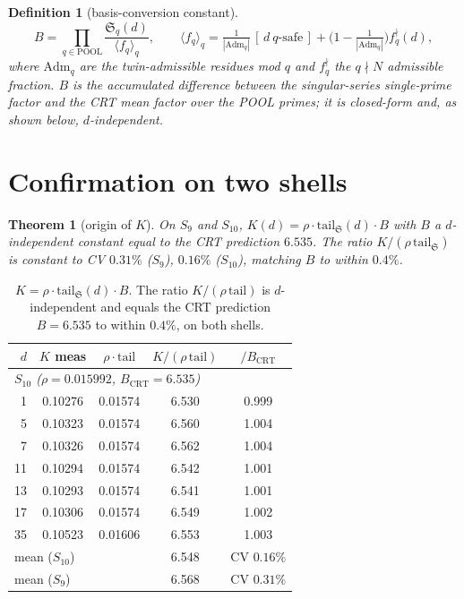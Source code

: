 \documentclass[11pt]{article}
\newcommand{\Adm}{\mathrm{Adm}}
\newtheorem{theorem}{Theorem}\newtheorem{definition}{Definition}
\begin{document}
\begin{definition}[basis-conversion constant]
\[
  B=\prod_{q\in\mathrm{POOL}}\frac{\mathfrak{S}_q(d)}{\langle f_q\rangle_q},\qquad
  \langle f_q\rangle_q=\tfrac{1}{|\!\Adm_q|}\,[\,d\ q\text{-safe}\,]
   +\bigl(1-\tfrac{1}{|\!\Adm_q|}\bigr)f_q^{\nmid}(d),
\]
where $\Adm_q$ are the twin-admissible residues mod $q$ and $f_q^{\nmid}$ the
$q\nmid N$ admissible fraction. $B$ is the accumulated difference between the
singular-series single-prime factor and the CRT mean factor over the POOL primes;
it is closed-form and, as shown below, $d$-independent.
\end{definition}

\section{Confirmation on two shells}

\begin{theorem}[origin of $K$]\label{thm:K}
On $S_9$ and $S_{10}$, $K(d)=\rho\cdot\mathrm{tail}_{\mathfrak S}(d)\cdot B$ with
$B$ a $d$-independent constant equal to the CRT prediction $6.535$. The ratio
$K/(\rho\,\mathrm{tail}_{\mathfrak S})$ is constant to CV $0.31\%$ ($S_9$),
$0.16\%$ ($S_{10}$), matching $B$ to within $0.4\%$.
\end{theorem}

\begin{table}[h]\centering\small
\begin{tabular}{rcccc}
\toprule
$d$ & $K$ meas & $\rho\cdot\mathrm{tail}$ & $K/(\rho\,\mathrm{tail})$ & $/B_{\mathrm{CRT}}$\\
\midrule
\multicolumn{5}{l}{\emph{$S_{10}$ ($\rho=0.015992$, $B_{\mathrm{CRT}}=6.535$)}}\\
1  & 0.10276 & 0.01574 & 6.530 & 0.999\\
5  & 0.10323 & 0.01574 & 6.560 & 1.004\\
7  & 0.10326 & 0.01574 & 6.562 & 1.004\\
11 & 0.10294 & 0.01574 & 6.542 & 1.001\\
13 & 0.10293 & 0.01574 & 6.541 & 1.001\\
17 & 0.10306 & 0.01574 & 6.549 & 1.002\\
35 & 0.10523 & 0.01606 & 6.553 & 1.003\\
\midrule
\multicolumn{2}{l}{mean ($S_{10}$)} & & 6.548 & CV $0.16\%$\\
\multicolumn{2}{l}{mean ($S_9$)} & & 6.568 & CV $0.31\%$\\
\bottomrule
\end{tabular}
\caption{$K=\rho\cdot\mathrm{tail}_{\mathfrak S}(d)\cdot B$. The ratio
$K/(\rho\,\mathrm{tail})$ is $d$-independent and equals the CRT prediction $B=6.535$
to within $0.4\%$, on both shells.}
\label{tab:K}
\end{table}
\end{document}
